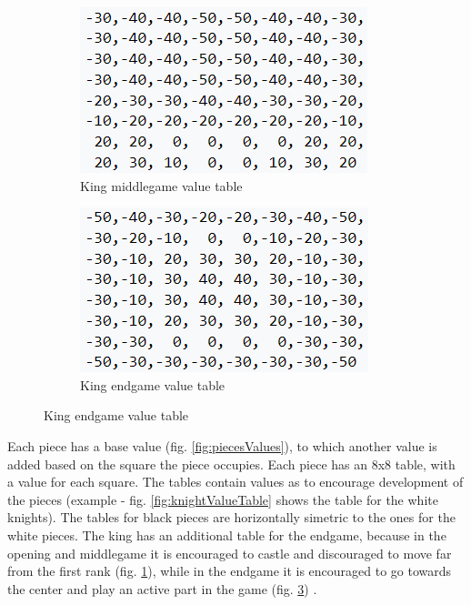 \begin{figure}[h]
    \centering
    \caption{King value tables}
    \begin{subfigure}{0.49\textwidth}
        \centering
        \includegraphics{figures/king_value_table_middlegame.png}
        \caption{King middlegame value table}
        \label{fig:kingValueTableMiddlegame}
    \end{subfigure}
    \begin{subfigure}{0.49\textwidth}
        \centering
        \includegraphics{figures/king_value_table_endgame.png}
        \caption{King endgame value table}
        \label{fig:kingValueTableEndgame}
    \end{subfigure}
\end{figure}

Each piece has a base value (fig. \ref{fig:piecesValues}), to which another value is added based on the square the piece occupies. Each piece has an 8x8 table, with a value for each square. The tables contain values as to encourage development of the pieces (example - fig. \ref{fig:knightValueTable} shows the table for the white knights). The tables for black pieces are horizontally simetric to the ones for the white pieces. The king has an additional table for the endgame, because in the opening and middlegame it is encouraged to castle and discouraged to move far from the first rank (fig. \ref{fig:kingValueTableMiddlegame}), while in the endgame it is encouraged to go towards the center and play an active part in the game (fig. \ref{fig:kingValueTableEndgame}) \cite{wikiEval}.

